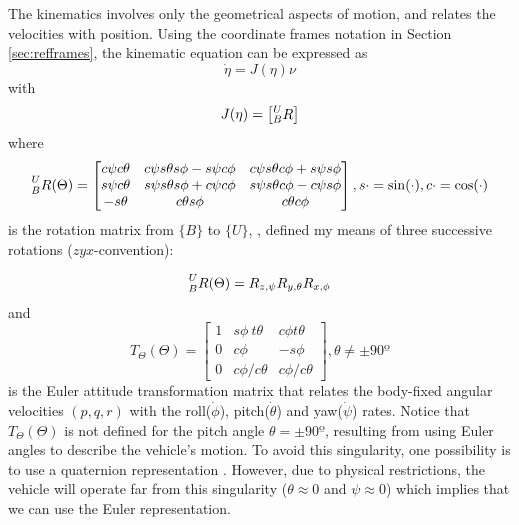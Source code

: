 \par The kinematics involves only the geometrical aspects of motion, and relates the velocities with position. Using the coordinate frames notation in Section \ref{sec:refframes}, the kinematic equation can be expressed as
\begin{equation}
    \dot{\eta} = J(\eta)\nu
\end{equation}
with 
\begin{equation}
    J(\eta) = \begin{bmatrix}
        \prescript{U}{B}{R}
    \end{bmatrix}
\end{equation}
where
\begin{equation}
    \prescript{U}{B}{R(\Theta)} = \begin{bmatrix}
        c\psi c\theta & c\psi s\theta s\phi-s \psi c\phi & c\psi s\theta c\phi+s\psi s\phi \\
        s\psi c\theta & s\psi s\theta s\phi+c\psi c\phi & s\psi s\theta c\phi-c\psi s\phi \\
        -s\theta & c\theta s\phi & c\theta c\phi
    \end{bmatrix}, s\cdot = \sin(\cdot), c\cdot=\cos(\cdot)
\end{equation}
is the rotation matrix from $\{B\}$ to $\{U\}$, \cite{fossen2006nonlinear}, defined my means of three successive rotations ($zyx$-convention):

\begin{equation}
    \prescript{U}{B}{R(\Theta)} = R_{z,\psi}R_{y,\theta}R_{x,\phi}
\end{equation}
and
\begin{equation}
    T_{\Theta}(\Theta) = \begin{bmatrix}
        1 & s\phi\ t\theta & c\phi t\theta \\
        0 & c\phi & -s\phi \\
        0 & c\phi / c\theta & c\phi / c\theta 
    \end{bmatrix}, \theta \neq \pm 90º
\end{equation}
is the Euler attitude transformation matrix that relates the body-fixed angular velocities $(p, q, r)$ with the roll($\dot{\phi}$), pitch($\dot{\theta}$) and yaw($\dot{\psi}$) rates. Notice that $T_\Theta(\Theta)$ is not defined for the pitch angle $\theta = \pm90º$, resulting from using Euler angles to describe the vehicle’s motion. To avoid this singularity, one possibility is to use a quaternion representation \cite{fossen2006nonlinear}. However, due to physical restrictions, the vehicle will operate far from this singularity ($\theta\approx 0$ and $\psi \approx 0$) which implies that we can use the Euler representation.


